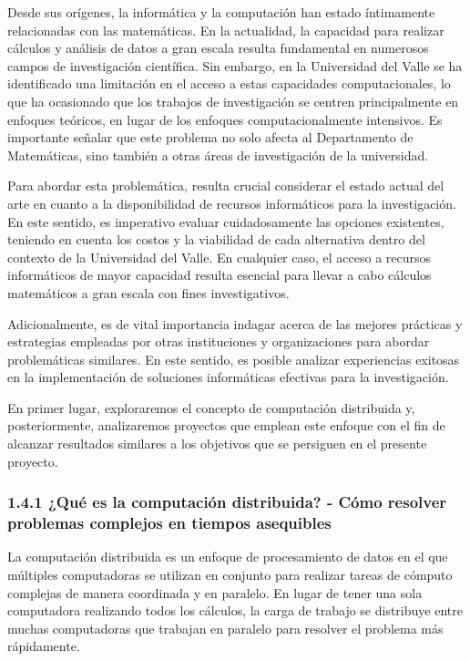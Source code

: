 \begin{doublespace}
\begin{multicols}{2}
  Desde sus orígenes, la informática y la computación han estado íntimamente relacionadas con las matemáticas. En la actualidad, la capacidad para realizar cálculos y análisis de datos a gran escala resulta fundamental en numerosos campos de investigación científica. Sin embargo, en la Universidad del Valle se ha identificado una limitación en el acceso a estas capacidades computacionales, lo que ha ocasionado que los trabajos de investigación se centren principalmente en enfoques teóricos, en lugar de los enfoques computacionalmente intensivos. Es importante señalar que este problema no solo afecta al Departamento de Matemáticas, sino también a otras áreas de investigación de la universidad.

  Para abordar esta problemática, resulta crucial considerar el estado actual del arte en cuanto a la disponibilidad de recursos informáticos para la investigación. En este sentido, es imperativo evaluar cuidadosamente las opciones existentes, teniendo en cuenta los costos y la viabilidad de cada alternativa dentro del contexto de la Universidad del Valle. En cualquier caso, el acceso a recursos informáticos de mayor capacidad resulta esencial para llevar a cabo cálculos matemáticos a gran escala con fines investigativos.
  
  Adicionalmente, es de vital importancia indagar acerca de las mejores prácticas y estrategias empleadas por otras instituciones y organizaciones para abordar problemáticas similares. En este sentido, es posible analizar experiencias exitosas en la implementación de soluciones informáticas efectivas para la investigación.
  
  En primer lugar, exploraremos el concepto de computación distribuida y, posteriormente, analizaremos proyectos que emplean este enfoque con el fin de alcanzar resultados similares a los objetivos que se persiguen en el presente proyecto. 

  \subsubsection{1.4.1 ¿Qué es la computación distribuida? - Cómo resolver problemas complejos en tiempos asequibles}
  
  La computación distribuida es un enfoque de procesamiento de datos en el que múltiples computadoras se utilizan en conjunto para realizar tareas de cómputo complejas de manera coordinada y en paralelo. En lugar de tener una sola computadora realizando todos los cálculos, la carga de trabajo se distribuye entre muchas computadoras que trabajan en paralelo para resolver el problema más rápidamente.


\end{multicols}
\end{doublespace}
